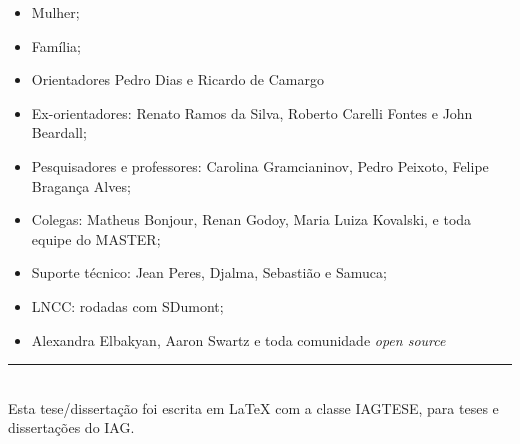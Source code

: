 \begin{itemize}
    \item Mulher; 
    \item Família;
    \item Orientadores Pedro Dias e Ricardo de Camargo
    \item Ex-orientadores: Renato Ramos da Silva, Roberto Carelli Fontes e John Beardall;
    \item Pesquisadores e professores: Carolina Gramcianinov, Pedro Peixoto, Felipe Bragança Alves;
    \item Colegas: Matheus Bonjour, Renan Godoy, Maria Luiza Kovalski, e toda equipe do MASTER;
    \item Suporte técnico: Jean Peres, Djalma, Sebastião e Samuca;
    \item LNCC: rodadas com SDumont;
    \item Alexandra Elbakyan, Aaron Swartz e toda comunidade \textit{open source}
\end{itemize}

\vfill

\begin{flushleft}
\rule{6cm}{0.5pt}\\
{\footnotesize{Esta tese/dissertação foi escrita em \LaTeX{} com a classe IAGTESE, para teses e dissertações do IAG.}}
\end{flushleft}
